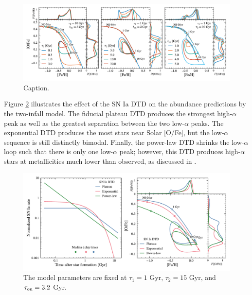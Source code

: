 \documentclass[twocolumn,twocolappendix,linenumbers]{aastex631}
\begin{document}
\begin{figure}
    \centering
    \includegraphics{figures/onezone_params.pdf}
    \caption{Caption.}
    \label{fig:onezone-params}
\end{figure}

Figure \ref{fig:onezone-dtd} illustrates the effect of the SN Ia DTD on the abundance predictions by the two-infall model. The fiducial plateau DTD produces the strongest high-$\alpha$ peak as well as the greatest separation between the two low-$\alpha$ peaks. The exponential DTD produces the most stars near Solar [O/Fe], but the low-$\alpha$ sequence is still distinctly bimodal. Finally, the power-law DTD shrinks the low-$\alpha$ loop such that there is only one low-$\alpha$ peak; however, this DTD produces high-$\alpha$ stars at metallicities much lower than observed, as discussed in \citet{dubay_galactic_2024}.

\begin{figure}
    \centering
    \includegraphics{figures/onezone_dtd.pdf}
    \caption{The model parameters are fixed at $\tau_1=1$ Gyr, $\tau_2=15$ Gyr, and $\tau_{\rm on}=3.2$ Gyr.}
    \label{fig:onezone-dtd}
\end{figure}
\end{document}
